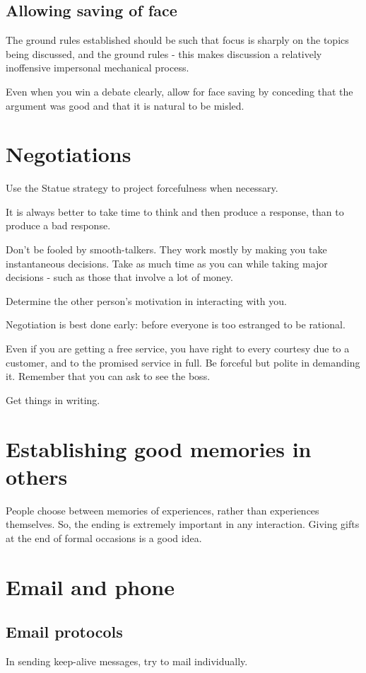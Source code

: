 \documentclass[oneside, article]{memoir}
\begin{document}
\section{Allowing saving of face}
The ground rules established should be such that focus is sharply on the topics being discussed, and the ground rules - this makes discussion a relatively inoffensive impersonal mechanical process.

Even when you win a debate clearly, allow for face saving by conceding that the argument was good and that it is natural to be misled.

\chapter{Negotiations}
\subitem Use the Statue strategy to project forcefulness when necessary.

\subitem It is always better to take time to think and then produce a response, than to produce a bad response.

\subitem Don't be fooled by smooth-talkers. They work mostly by making you take instantaneous decisions. Take as much time as you can while taking major decisions - such as those that involve a lot of money.

\subitem Determine the other person's motivation in interacting with you.

\subitem Negotiation is best done early: before everyone is too estranged to be rational.

\subitem Even if you are getting a free service, you have right to every courtesy due to a customer, and to the promised service in full. Be forceful but polite in demanding it. Remember that you can ask to see the boss.

\subitem Get things in writing.

\chapter{Establishing good memories in others}
People choose between memories of experiences, rather than experiences themselves. So, the ending is extremely important in any interaction. Giving gifts at the end of formal occasions is a good idea.

\chapter{Email and phone}
\section{Email protocols}
In sending keep-alive messages, try to mail individually.
\end{document}

